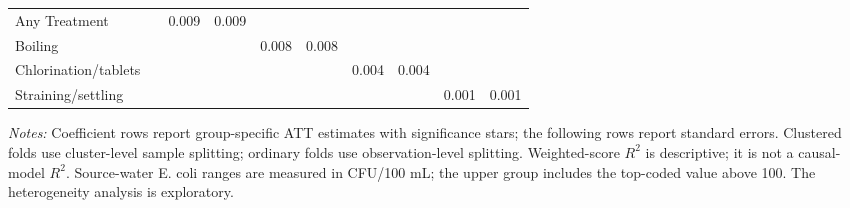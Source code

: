 \begin{landscape}
\begin{table}[p]
\begin{adjustbox}{max width=\linewidth, center}
\begin{tabular}{llcccccccc}
\quad Any Treatment &  & 0.009 & 0.009 &  &  &  &  &  &  \\
\quad Boiling &  &  &  & 0.008 & 0.008 &  &  &  &  \\
\quad Chlorination/tablets &  &  &  &  &  & 0.004 & 0.004 &  &  \\
\quad Straining/settling &  &  &  &  &  &  &  & 0.001 & 0.001 \\
\bottomrule
\end{tabular}
\end{adjustbox}
\par\vspace{3pt}
\begin{minipage}{\linewidth}\footnotesize \textit{Notes:} Coefficient rows report group-specific ATT estimates with significance stars; the following rows report standard errors. Clustered folds use cluster-level sample splitting; ordinary folds use observation-level splitting. Weighted-score $R^2$ is descriptive; it is not a causal-model $R^2$. Source-water E. coli ranges are measured in CFU/100 mL; the upper group includes the top-coded value above 100. The heterogeneity analysis is exploratory.\end{minipage}
\end{table}
\end{landscape}